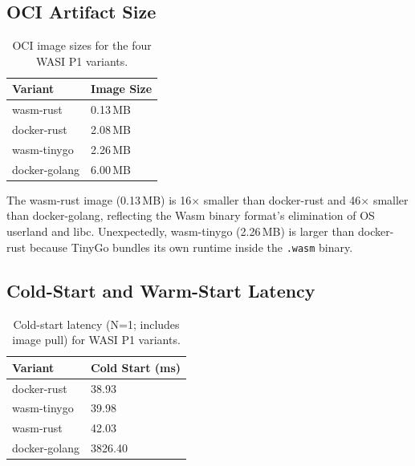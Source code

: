 \subsection{OCI Artifact Size}

\begin{table}[htbp]
    \centering
    \caption{OCI image sizes for the four WASI P1 variants.}
    \label{tab:app_image_sizes}
    \begin{tabular}{ll}
        \hline
        \textbf{Variant} & \textbf{Image Size} \\
        \hline
        wasm-rust     & 0.13\,MB \\
        docker-rust   & 2.08\,MB \\
        wasm-tinygo   & 2.26\,MB \\
        docker-golang & 6.00\,MB \\
        \hline
    \end{tabular}
\end{table}

The wasm-rust image (0.13\,MB) is 16$\times$ smaller than docker-rust and 46$\times$ smaller than docker-golang, reflecting the \acs{Wasm} binary format's elimination of \acs{OS} userland and libc. Unexpectedly, wasm-tinygo (2.26\,MB) is larger than docker-rust because TinyGo bundles its own runtime inside the \texttt{.wasm} binary.

\subsection{Cold-Start and Warm-Start Latency}

\begin{table}[htbp]
    \centering
    \caption{Cold-start latency (N=1; includes image pull) for WASI P1 variants.}
    \label{tab:app_cold_start}
    \begin{tabular}{ll}
        \hline
        \textbf{Variant} & \textbf{Cold Start (ms)} \\
        \hline
        docker-rust   & 38.93 \\
        wasm-tinygo   & 39.98 \\
        wasm-rust     & 42.03 \\
        docker-golang & 3826.40 \\
        \hline
    \end{tabular}
\end{table}

